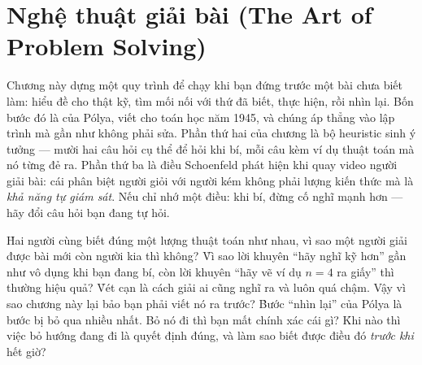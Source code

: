 \documentclass[../../algorithm.tex]{subfiles}
\begin{document}
\chapter{Nghệ thuật giải bài (The Art of Problem Solving)}

\begin{tomtat}
Chương này dựng một quy trình để chạy khi bạn đứng trước một bài chưa biết làm: hiểu đề cho thật kỹ, tìm mối nối với thứ đã biết, thực hiện, rồi nhìn lại. Bốn bước đó là của Pólya, viết cho toán học năm 1945, và chúng áp thẳng vào lập trình mà gần như không phải sửa. Phần thứ hai của chương là bộ heuristic sinh ý tưởng --- mười hai câu hỏi cụ thể để hỏi khi bí, mỗi câu kèm ví dụ thuật toán mà nó từng đẻ ra. Phần thứ ba là điều Schoenfeld phát hiện khi quay video người giải bài: cái phân biệt người giỏi với người kém không phải lượng kiến thức mà là \emph{khả năng tự giám sát}. Nếu chỉ nhớ một điều: khi bí, đừng cố nghĩ mạnh hơn --- hãy đổi câu hỏi bạn đang tự hỏi.
\end{tomtat}

\begin{nentang}
\end{nentang}

\begin{khoigoi}
\h{Hai người cùng biết đúng một lượng thuật toán như nhau, vì sao một người giải được bài mới còn người kia thì không?}
\h{Vì sao lời khuyên ``hãy nghĩ kỹ hơn'' gần như vô dụng khi bạn đang bí, còn lời khuyên ``hãy vẽ ví dụ \(n=4\) ra giấy'' thì thường hiệu quả?}
\h{Vét cạn là cách giải ai cũng nghĩ ra và luôn quá chậm. Vậy vì sao chương này lại bảo bạn phải viết nó ra trước?}
\h{Bước ``nhìn lại'' của Pólya là bước bị bỏ qua nhiều nhất. Bỏ nó đi thì bạn mất chính xác cái gì?}
\h{Khi nào thì việc bỏ hướng đang đi là quyết định đúng, và làm sao biết được điều đó \emph{trước khi} hết giờ?}
\end{khoigoi}
\end{document}
